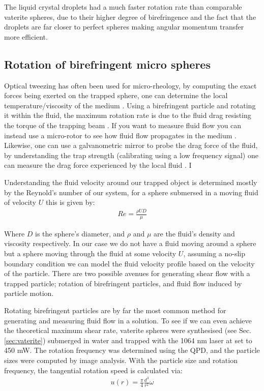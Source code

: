 The liquid crystal droplets had a much faster rotation rate than comparable 
vaterite spheres, due to their higher degree of birefringence and the fact
that the droplets are far closer to perfect spheres making angular momentum
transfer more efficient. 

\subsection{Rotation of birefringent micro spheres} 
Optical tweezing has often been used for micro-rheology, by computing the
exact forces being exerted on the trapped sphere, one can determine the
local temperature/viscosity of the medium \cite{Millen2014, RodriguezSevilla2018}.
Using a birefringent particle and rotating it within the fluid, the maximum 
rotation rate is due to the fluid drag resisting the torque of the 
trapping beam \cite{RodriguezSevilla2018}. If you want to measure 
fluid flow you can instead use a micro-rotor to see how fluid flow 
propagates in the medium \cite{Knoener2005}. Likewise, one can use 
a galvanometric mirror to probe the drag force of the fluid, by 
understanding the trap strength (calibrating using a low frequency 
signal) one can measure the drag force experienced by the local fluid \cite{RobertsonAnderson2018}. I

Understanding the fluid velocity around our trapped object is determined 
mostly by the Reynold's number of our system, for a sphere submersed 
in a moving fluid of velocity $U$ this is given by:
\begin{align}
	Re = \frac{\rho UD}{\mu}
\end{align}

Where $D$ is the sphere's diameter, and $\rho$ and $\mu$ are the fluid's 
density and viscosity respectively. In our case we do not have a fluid
moving around a sphere but a sphere moving through the fluid at some 
velocity $U$, assuming a no-slip boundary condition we can model the 
fluid velocity profile based on the velocity of the particle. There are 
two possible avenues for generating shear flow with a trapped particle; 
rotation of birefringent particles, and fluid flow induced by particle motion. 

Rotating birefringent particles are by far the most common method for 
generating and measuring fluid flow in a solution. To see if we can 
even achieve the theoretical maximum shear rate, vaterite spheres 
were synthesised (see Sec.\ref{sec:vaterite}) submerged in water and 
trapped with the 1064 nm laser at set to 450 mW. The rotation frequency 
was determined using the QPD, and the particle sizes were computed 
by image analysis. With the particle size and rotation frequency, the 
tangential rotation speed is calculated via:
\begin{align}
	\label{eq:birefringent_speed}
	u(r) = \frac{\pi}{4}\frac{d^3}{r^2}\omega
\end{align}

